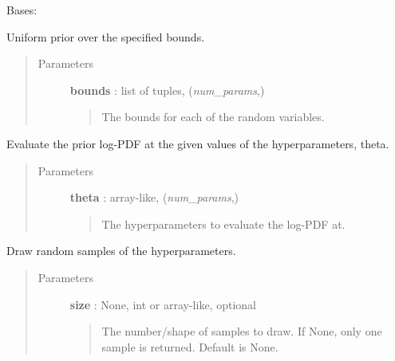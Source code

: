 \documentclass[letterpaper,10pt,english]{sphinxmanual}
\begin{document}
\begin{fulllineitems}
\label{gptools:gptools.utils.UniformJointPrior}
Bases: {\hyperref[gptools:gptools.utils.JointPrior]{}}

Uniform prior over the specified bounds.
\begin{quote}\begin{description}
\item[{Parameters}] \leavevmode
\textbf{bounds} : list of tuples, (\emph{num\_params},)
\begin{quote}

The bounds for each of the random variables.
\end{quote}

\end{description}\end{quote}

\begin{fulllineitems}
\label{gptools:gptools.utils.UniformJointPrior.__call__}
Evaluate the prior log-PDF at the given values of the hyperparameters, theta.
\begin{quote}\begin{description}
\item[{Parameters}] \leavevmode
\textbf{theta} : array-like, (\emph{num\_params},)
\begin{quote}

The hyperparameters to evaluate the log-PDF at.
\end{quote}

\end{description}\end{quote}

\end{fulllineitems}


\begin{fulllineitems}
\label{gptools:gptools.utils.UniformJointPrior.random_draw}
Draw random samples of the hyperparameters.
\begin{quote}\begin{description}
\item[{Parameters}] \leavevmode
\textbf{size} : None, int or array-like, optional
\begin{quote}

The number/shape of samples to draw. If None, only one sample is
returned. Default is None.
\end{quote}

\end{description}\end{quote}

\end{fulllineitems}


\end{fulllineitems}
\end{document}
